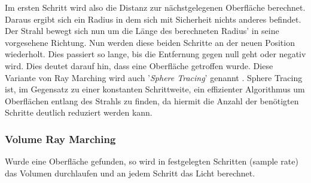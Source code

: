 Im ersten Schritt wird also die Distanz zur nächstgelegenen Oberfläche berechnet. Daraus ergibt sich ein Radius in dem sich 
mit Sicherheit nichts anderes befindet. Der Strahl bewegt sich nun um die Länge des berechneten Radius' in seine vorgesehene Richtung.
Nun werden diese beiden Schritte an der neuen Position wiederholt. Dies passiert so lange, bis die Entfernung gegen null geht oder negativ wird. 
Dies deutet darauf hin, dass eine Oberfläche getroffen wurde. Diese Variante von Ray Marching wird auch '\textit{Sphere Tracing}' genannt \parencite{Hart95}.
Sphere Tracing ist, im Gegensatz zu einer konstanten Schrittweite, ein effizienter Algorithmus um Oberflächen entlang des Strahls zu finden,
da hiermit die Anzahl der benötigten Schritte deutlich reduziert werden kann. 


\subsubsection{Volume Ray Marching}
Wurde eine Oberfläche gefunden, so wird in festgelegten Schritten (sample rate) das Volumen durchlaufen und an jedem Schritt das Licht berechnet.


